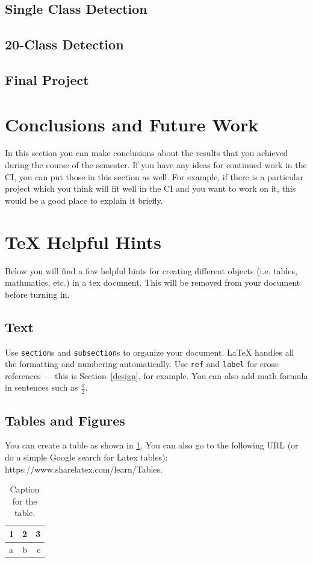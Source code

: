 \subsection{Single Class Detection}
\subsection{20-Class Detection}
\subsection{Final Project}

\section{Conclusions and Future Work}

In this section you can make conclusions about the results that you achieved during the course of the semester.  If you have any ideas for continued work in the CI, you can put those in this section as well.  For example, if there is a particular project which you think will fit well in the CI and you want to work on it, this would be a good place to explain it briefly.

\section*{TeX Helpful Hints}\label{design}

Below you will find a few helpful hints for creating different objects (i.e. tables, mathmatics, etc.) in a tex document.  This will be removed from your document before turning in.

\subsection*{Text}

Use \texttt{section}s and \texttt{subsection}s to organize your document. \LaTeX{} handles all the formatting and numbering automatically. Use \texttt{ref} and \texttt{label} for cross-references --- this is Section~\ref{design}, for example.
You can also add math formula in sentences such as $\frac{\pi}{2}$.
\subsection*{Tables and Figures}
You can create a table as shown in \ref{tab:table1}.  You can also go to the following URL (or do a simple Google search for Latex tables): https://www.sharelatex.com/learn/Tables.
\begin{table}
	\centering
	\caption{Caption for the table.}
	\label{tab:table1}
	\begin{tabular}{l|c||r}
		\hline
		1 & 2 & 3\\
		\hline
		a & b & c\\
		\hline
	\end{tabular}
\end{table}

